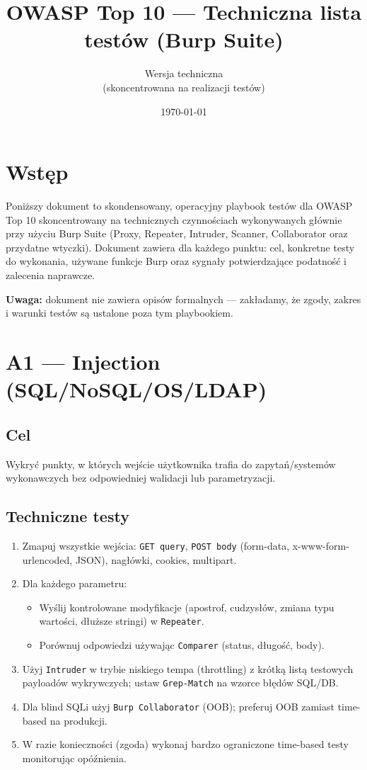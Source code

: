 \documentclass[11pt,a4paper]{article}
\title{OWASP Top 10 — Techniczna lista testów (Burp Suite)}
\author{Wersja techniczna \\ (skoncentrowana na realizacji testów)}
\date{\today}
\begin{document}
	\maketitle
	\tableofcontents
	\bigskip
	
	\section*{Wstęp}
	Poniższy dokument to skondensowany, operacyjny playbook testów dla OWASP Top 10 skoncentrowany na technicznych czynnościach wykonywanych głównie przy użyciu Burp Suite (Proxy, Repeater, Intruder, Scanner, Collaborator oraz przydatne wtyczki). Dokument zawiera dla każdego punktu: cel, konkretne testy do wykonania, używane funkcje Burp oraz sygnały potwierdzające podatność i zalecenia naprawcze.
	
	\vspace{1em}
	\noindent\textbf{Uwaga:} dokument nie zawiera opisów formalnych — zakładamy, że zgody, zakres i warunki testów są ustalone poza tym playbookiem.
	
	\newpage
	
	\section{A1 --- Injection (SQL/NoSQL/OS/LDAP)}
	\subsection*{Cel}
	Wykryć punkty, w których wejście użytkownika trafia do zapytań/systemów wykonawczych bez odpowiedniej walidacji lub parametryzacji.
	
	\subsection*{Techniczne testy}
	\begin{enumerate}[leftmargin=*,label=\arabic*)]
		\item Zmapuj wszystkie wejścia: \texttt{GET query}, \texttt{POST body} (form-data, x-www-form-urlencoded, JSON), nagłówki, cookies, multipart.
		\item Dla każdego parametru:
		\begin{itemize}
			\item Wyślij kontrolowane modyfikacje (apostrof, cudzysłów, zmiana typu wartości, dłuższe stringi) w \texttt{Repeater}.
			\item Porównuj odpowiedzi używając \texttt{Comparer} (status, długość, body).
		\end{itemize}
		\item Użyj \texttt{Intruder} w trybie niskiego tempa (throttling) z krótką listą testowych payloadów wykrywczych; ustaw \texttt{Grep-Match} na wzorce błędów SQL/DB.
		\item Dla blind SQLi użyj \texttt{Burp Collaborator} (OOB); preferuj OOB zamiast time-based na produkcji.
		\item W razie konieczności (zgoda) wykonaj bardzo ograniczone time-based testy monitorując opóźnienia.
	\end{enumerate}
	
\end{document}
